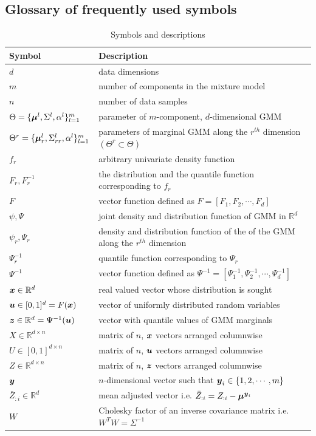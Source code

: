 \documentclass{article}
\begin{document}
\subsection{Glossary of frequently used symbols} \label{apd:symbol_glossary}
\begin{table}[h]
\caption{Symbols and descriptions}
\label{tab:symbol_glossary}
\begin{tabular}{ll}
\hline
\textbf{Symbol} & \textbf{Description} \\
\hline
$d$ & data dimensions \\
$m$ & number of components in the mixture model \\
$n$ & number of data samples \\
$\Theta = \{\boldsymbol{\mu}^l, \Sigma^l, \alpha^l\}_{l=1}^m$ & parameter of $m$-component, $d$-dimensional GMM \\
$\Theta^r= \{\boldsymbol{\mu}_r^l, \Sigma_{rr}^l, \alpha^l\}_{l=1}^m$ & parameters of marginal GMM along the $r^{th}$ dimension $(\Theta^r \subset \Theta)$ \\
$f_r $ & arbitrary univariate density function \\
$F_r, F_r^{-1}$ & the distribution and the quantile function corresponding to $f_r$ \\
$F$ & vector function defined as $F = [F_1, F_2,\cdots,F_d]$ \\
$\psi, \Psi$ & joint density and distribution function of GMM in $\mathbb{R}^d$ \\
$\psi_r , \Psi_r$ & density and distribution function of the of the GMM along the $r^{th}$ dimension \\
$\Psi_r^{-1}$ & quantile function corresponding to $\Psi_r$ \\
$\Psi^{-1}$ & vector function defined as $\Psi^{-1} = [\Psi_1^{-1}, \Psi_2^{-1},\cdots,\Psi_d^{-1}]$ \\
$\boldsymbol{x} \in \mathbb{R}^d$ & real valued vector whose distribution is sought \\
$\boldsymbol{u} \in [0,1]^d=F(\boldsymbol{x})$ &  vector of uniformly distributed random variables \\
$\boldsymbol{z} \in \mathbb{R}^d =\Psi^{-1}(\boldsymbol{u}) $ &  vector with quantile values of GMM marginals \\
$X \in \mathbb{R}^{d \times n}$ & matrix of $n$, $\boldsymbol{x}$ vectors arranged columnwise \\
$U \in [0,1]^{d \times n}$ & matrix of $n$, $\boldsymbol{u}$ vectors arranged columnwise \\
$Z \in \mathbb{R}^{d \times n}$ & matrix of $n$, $\boldsymbol{z}$ vectors arranged columnwise \\
$\boldsymbol{y}$ & $n$-dimensional vector such that $\boldsymbol{y}_i \in \{1,2,\cdots,m\}$ \\
$\bar{Z}_{:i} \in \mathbb{R}^d$ & mean adjusted vector i.e. $\bar{Z}_{:i} = Z_{:i} - \boldsymbol{\mu}^{\boldsymbol{y}_i}$ \\
$W $ & Cholesky factor of an inverse covariance matrix i.e. $W^TW=\Sigma^{-1}$ \\
\hline
\end{tabular}
\end{table}
\end{document}
